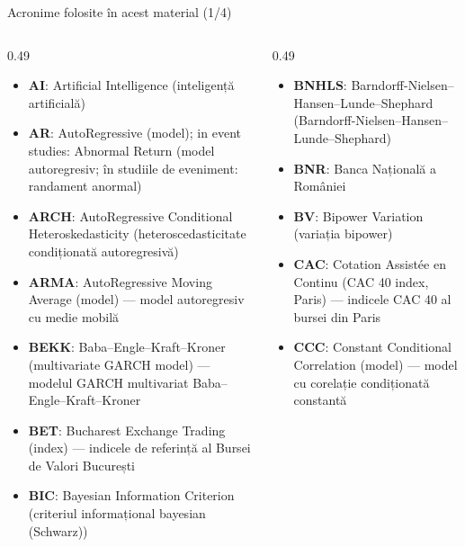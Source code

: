 
{
\begin{frame}[noframenumbering]
    \titlepage
\end{frame}
}
\begin{frame}{Acronime folosite în acest material (1/4)}
\begin{columns}[T]
\begin{column}{0.49\textwidth}
\begin{itemize}\setlength{\itemsep}{0pt}
    \item \textbf{AI}: Artificial Intelligence (inteligență artificială)
    \item \textbf{AR}: AutoRegressive (model); in event studies: Abnormal Return (model autoregresiv; în studiile de eveniment: randament anormal)
    \item \textbf{ARCH}: AutoRegressive Conditional Heteroskedasticity (heteroscedasticitate condiționată autoregresivă)
    \item \textbf{ARMA}: AutoRegressive Moving Average (model) — model autoregresiv cu medie mobilă
    \item \textbf{BEKK}: Baba–Engle–Kraft–Kroner (multivariate GARCH model) — modelul GARCH multivariat Baba–Engle–Kraft–Kroner
    \item \textbf{BET}: Bucharest Exchange Trading (index) — indicele de referință al Bursei de Valori București
    \item \textbf{BIC}: Bayesian Information Criterion (criteriul informațional bayesian (Schwarz))
\end{itemize}
\end{column}
\begin{column}{0.49\textwidth}
\begin{itemize}\setlength{\itemsep}{0pt}
    \item \textbf{BNHLS}: Barndorff-Nielsen–Hansen–Lunde–Shephard (Barndorff-Nielsen–Hansen–Lunde–Shephard)
    \item \textbf{BNR}: Banca Națională a României
    \item \textbf{BV}: Bipower Variation (variația bipower)
    \item \textbf{CAC}: Cotation Assistée en Continu (CAC 40 index, Paris) — indicele CAC 40 al bursei din Paris
    \item \textbf{CCC}: Constant Conditional Correlation (model) — model cu corelație condiționată constantă

\end{itemize}
\end{column}
\end{columns}
\end{frame}
